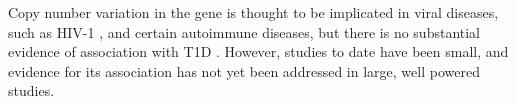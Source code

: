 Copy number variation in the  gene is thought to be implicated in viral diseases, such as HIV-1 \citep{Martin:2002el,Pelak:2011ia},
and certain autoimmune diseases, but there is no substantial evidence of association with T1D \citep{Korner:2012im}.
However, studies to date have been small, and evidence for its association has not yet been addressed in large, well powered studies.  






